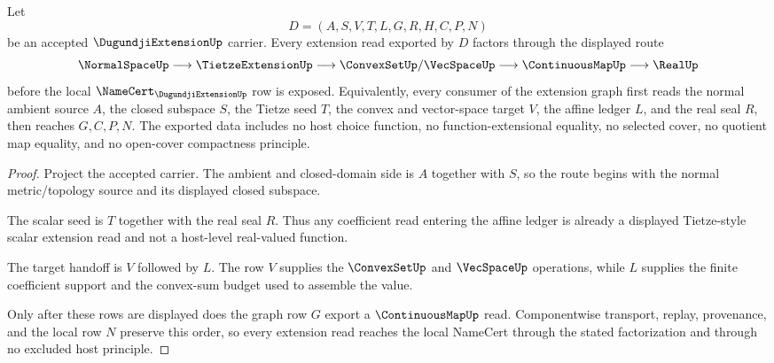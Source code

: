 \begin{theorem}
\label{thm:dugundji-extension-affine-handoff}
Let
$$
D=(A,S,V,T,L,G,R,H,C,P,N)
$$
be an accepted $\DugundjiExtensionUp$ carrier. Every extension read exported by $D$ factors through the displayed route
$$
\NormalSpaceUp \longrightarrow \TietzeExtensionUp \longrightarrow \ConvexSetUp/\VecSpaceUp \longrightarrow \ContinuousMapUp \longrightarrow \RealUp
$$
before the local $\NameCert_{\DugundjiExtensionUp}$ row is exposed. Equivalently, every consumer of the extension graph first reads the normal ambient source $A$, the closed subspace $S$, the Tietze seed $T$, the convex and vector-space target $V$, the affine ledger $L$, and the real seal $R$, then reaches $G,C,P,N$. The exported data includes no host choice function, no function-extensional equality, no selected cover, no quotient map equality, and no open-cover compactness principle.
\end{theorem}
\begin{proof}
Project the accepted carrier. The ambient and closed-domain side is $A$ together with $S$, so the route begins with the normal metric/topology source and its displayed closed subspace.

The scalar seed is $T$ together with the real seal $R$. Thus any coefficient read entering the affine ledger is already a displayed Tietze-style scalar extension read and not a host-level real-valued function.

The target handoff is $V$ followed by $L$. The row $V$ supplies the $\ConvexSetUp$ and $\VecSpaceUp$ operations, while $L$ supplies the finite coefficient support and the convex-sum budget used to assemble the value.

Only after these rows are displayed does the graph row $G$ export a $\ContinuousMapUp$ read. Componentwise transport, replay, provenance, and the local row $N$ preserve this order, so every extension read reaches the local NameCert through the stated factorization and through no excluded host principle.
\end{proof}

